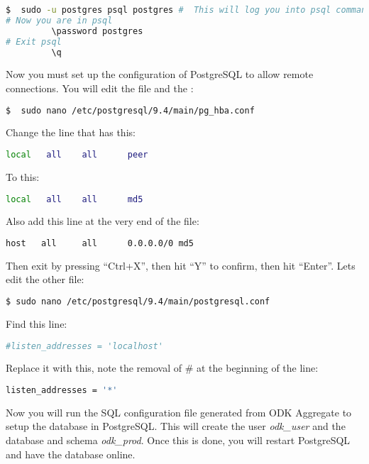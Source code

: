 \begin{lstlisting}[language=bash]
	$  sudo -u postgres psql postgres #  This will log you into psql command prompt.
# Now you are in psql
    	 \password postgres
# Exit psql
    	 \q
\end{lstlisting}

Now you must set up the configuration of PostgreSQL to allow remote connections. You will edit the  file and the :

\begin{lstlisting}[language=bash]
	$  sudo nano /etc/postgresql/9.4/main/pg_hba.conf
\end{lstlisting}

Change the line that has this:
\begin{lstlisting}[language=bash]
	local   all    all      peer
\end{lstlisting}
\noindent
To this:
\begin{lstlisting}[language=bash]
	local   all    all      md5
\end{lstlisting}

Also add this line at the very end of the file:
\begin{lstlisting}[language=bash]
	host   all     all      0.0.0.0/0 md5
\end{lstlisting}

Then exit by pressing ``Ctrl+X'', then hit ``Y'' to confirm, then hit ``Enter''. Lets edit the other file:

\begin{lstlisting}[language=bash]
	$ sudo nano /etc/postgresql/9.4/main/postgresql.conf
\end{lstlisting}

Find this line:
\begin{lstlisting}[language=bash]
	#listen_addresses = 'localhost'
\end{lstlisting}

Replace it with this, note the removal of  \# at the beginning of the line:

\begin{lstlisting}[language=bash]
	listen_addresses = '*'
\end{lstlisting}


Now you will run the SQL configuration file generated from ODK Aggregate to setup the database in PostgreSQL. This will create the user \emph{odk\_user} and the database and schema \emph{odk\_prod}. Once this is done, you will restart PostgreSQL and have the database online.

